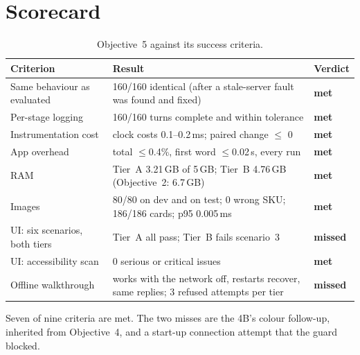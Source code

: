 \documentclass[11pt,a4paper]{article}
\newcommand{\met}{\textcolor{qaqua}{\textbf{met}}}
\newcommand{\missed}{\textcolor{qred}{\textbf{missed}}}
\begin{document}
\section{Scorecard}\label{sec:score}
\begin{table}[H]
\centering\small
\caption{Objective~5 against its success criteria.}\label{tab:score}
\begin{tabularx}{\textwidth}{p{3.2cm} L p{1.3cm}}
\toprule
Criterion & Result & Verdict \\
\midrule
Same behaviour as evaluated & 160/160 identical (after a stale-server fault was found and fixed) & \met \\
Per-stage logging & 160/160 turns complete and within tolerance & \met \\
Instrumentation cost & clock costs 0.1--0.2\,ms; paired change $\le$ 0 & \met \\
App overhead & total $\le$0.4\%, first word $\le$0.02\,s, every run & \met \\
RAM & Tier~A 3.21\,GB of 5\,GB; Tier~B 4.76\,GB (Objective~2: 6.7\,GB) & \met \\
Images & 80/80 on dev and on test; 0 wrong SKU; 186/186 cards; p95 0.005\,ms & \met \\
UI: six scenarios, both tiers & Tier~A all pass; Tier~B fails scenario~3 & \missed \\
UI: accessibility scan & 0 serious or critical issues & \met \\
Offline walkthrough & works with the network off, restarts recover, same replies; 3 refused attempts per tier &
\missed \\
\bottomrule
\end{tabularx}
\end{table}
Seven of nine criteria are met. The two misses are the 4B's colour follow-up, inherited from Objective~4, and a start-up
connection attempt that the guard blocked.

\end{document}
